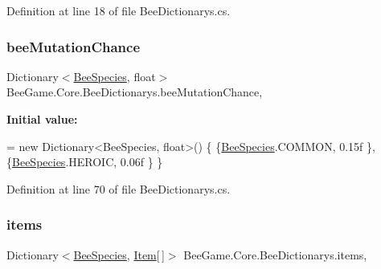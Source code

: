 Definition at line 18 of file Bee\+Dictionarys.\+cs.

\mbox{\label{class_bee_game_1_1_core_1_1_bee_dictionarys_a8928aea7b0d5b04fbf7b5055a9921385}} 
\subsubsection{\texorpdfstring{bee\+Mutation\+Chance}{beeMutationChance}}
{\footnotesize\ttfamily Dictionary$<$\hyperlink{namespace_bee_game_1_1_enums_aa2ead984825678d83c42d48f6382619c}{Bee\+Species}, float$>$ Bee\+Game.\+Core.\+Bee\+Dictionarys.\+bee\+Mutation\+Chance\hspace{0.3cm}{\ttfamily [static]}, {\ttfamily [private]}}

{\bfseries Initial value\+:}
\begin{DoxyCode}
= \textcolor{keyword}{new} Dictionary<BeeSpecies, float>()
        \{
            \{\hyperlink{namespace_bee_game_1_1_enums_aa2ead984825678d83c42d48f6382619c}{BeeSpecies}.COMMON, 0.15f \},
            \{\hyperlink{namespace_bee_game_1_1_enums_aa2ead984825678d83c42d48f6382619c}{BeeSpecies}.HEROIC, 0.06f \}
        \}
\end{DoxyCode}


Definition at line 70 of file Bee\+Dictionarys.\+cs.

\mbox{\label{class_bee_game_1_1_core_1_1_bee_dictionarys_a08901f100e7fa17a7a441b32ec680146}} 
\subsubsection{\texorpdfstring{items}{items}}
{\footnotesize\ttfamily Dictionary$<$\hyperlink{namespace_bee_game_1_1_enums_aa2ead984825678d83c42d48f6382619c}{Bee\+Species}, \hyperlink{struct_bee_game_1_1_items_1_1_item}{Item}\mbox{[}$\,$\mbox{]}$>$ Bee\+Game.\+Core.\+Bee\+Dictionarys.\+items\hspace{0.3cm}{\ttfamily [static]}, {\ttfamily [private]}}

